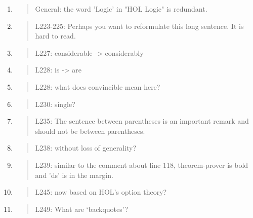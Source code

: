 \begin{enumerate}
\item \begin{quote}
    General: the word 'Logic' in "HOL Logic" is redundant.
  \end{quote}

\item \begin{quote}
    L223-225: Perhaps you want to reformulate this long sentence. It is hard to read.
  \end{quote}

\item \begin{quote}
    L227: considerable -> considerably
  \end{quote}

\item \begin{quote}
    L228: is -> are
  \end{quote}

\item \begin{quote}
    L228: what does convincible mean here?
  \end{quote}

\item \begin{quote}
    L230: single?
  \end{quote}

\item \begin{quote}
    L235: The sentence between parentheses is an important remark and
    should not be between parentheses.
  \end{quote}

\item \begin{quote}
    L238: without loss of generality?
  \end{quote}

\item \begin{quote}
    L239: similar to the comment about line 118, theorem-prover is
    bold and 'ds' is in the margin.
  \end{quote}

\item \begin{quote}
    L245: now based on HOL’s option theory?
  \end{quote}

\item \begin{quote}
    L249: What are ‘backquotes’?
  \end{quote}


\end{enumerate}
